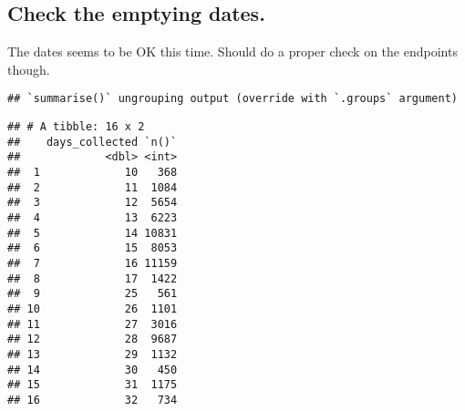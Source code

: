 \documentclass[]{article}
\newenvironment{Shaded}{\begin{snugshade}}{\end{snugshade}}
\newcommand{\CommentTok}[1]{\textcolor[rgb]{0.56,0.35,0.01}{\textit{#1}}}
\newcommand{\DataTypeTok}[1]{\textcolor[rgb]{0.13,0.29,0.53}{#1}}
\newcommand{\KeywordTok}[1]{\textcolor[rgb]{0.13,0.29,0.53}{\textbf{#1}}}
\newcommand{\NormalTok}[1]{#1}
\newcommand{\OperatorTok}[1]{\textcolor[rgb]{0.81,0.36,0.00}{\textbf{#1}}}
\newcommand{\StringTok}[1]{\textcolor[rgb]{0.31,0.60,0.02}{#1}}
\begin{document}
\hypertarget{check-the-emptying-dates.}{%
\subsection{Check the emptying dates.}\label{check-the-emptying-dates.}}

The dates seems to be OK this time. Should do a proper check on the
endpoints though.

\begin{Shaded}
\end{Shaded}

\begin{Shaded}
\end{Shaded}

\begin{verbatim}
## `summarise()` ungrouping output (override with `.groups` argument)
\end{verbatim}

\begin{verbatim}
## # A tibble: 16 x 2
##    days_collected `n()`
##             <dbl> <int>
##  1             10   368
##  2             11  1084
##  3             12  5654
##  4             13  6223
##  5             14 10831
##  6             15  8053
##  7             16 11159
##  8             17  1422
##  9             25   561
## 10             26  1101
## 11             27  3016
## 12             28  9687
## 13             29  1132
## 14             30   450
## 15             31  1175
## 16             32   734
\end{verbatim}
\end{document}
